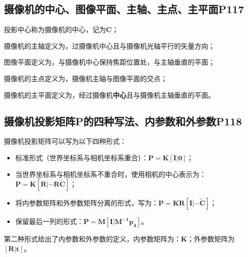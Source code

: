 \documentclass[11pt]{article}
\begin{document}
\subsection{摄像机的中心、图像平面、主轴、主点、主平面P117}
投影中心称为摄像机的中心，记为$\mathbf{C}$；\par
摄像机的主轴定义为，过摄像机中心且与摄像机光轴平行的矢量方向；\par
图像平面定义为，与摄像机中心保持焦距位置处，与主轴垂直的平面；\par
摄像机的主点定义为，摄像机主轴与图像平面的交点；\par
摄像机的主平面定义为，经过摄像机\textbf{中心}且与摄像机主轴垂直的平面。\par
\subsection{摄像机投影矩阵P的四种写法、内参数和外参数P118}
摄像机投影矩阵可以写为以下四种形式：
\begin{itemize}
  \item 标准形式（世界坐标系与相机坐标系重合）：$\mathbf{P}=\mathbf{K[I|0]}$；
  \item 当世界坐标系与相机坐标系不重合时，使用相机的中心表示为：$\mathbf{P}=\mathbf{K[R|-R\tilde{C}]}$；
  \item 将内参数矩阵和外参数矩阵分离的形式，写为：$\mathbf{P}=\mathbf{KR}\mathbf{[I|-\tilde{C}]}$；
  \item 保留最后一列的形式：$\mathbf{P}=\mathbf{M}\mathbf{[I|M^{-1}p_4]}$。
\end{itemize}\par
第二种形式给出了内参数和外参数的定义，内参数矩阵为：$\mathbf{K}$；外参数矩阵为$\mathbf{[R|t]}$。
\end{document}
